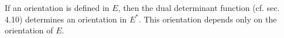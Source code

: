 If an orientation is defined in $E$, then the dual determinant function (cf. sec. 4.10) determines an orientation in $E^*$. This orientation depends only on the orientation of $E$.
